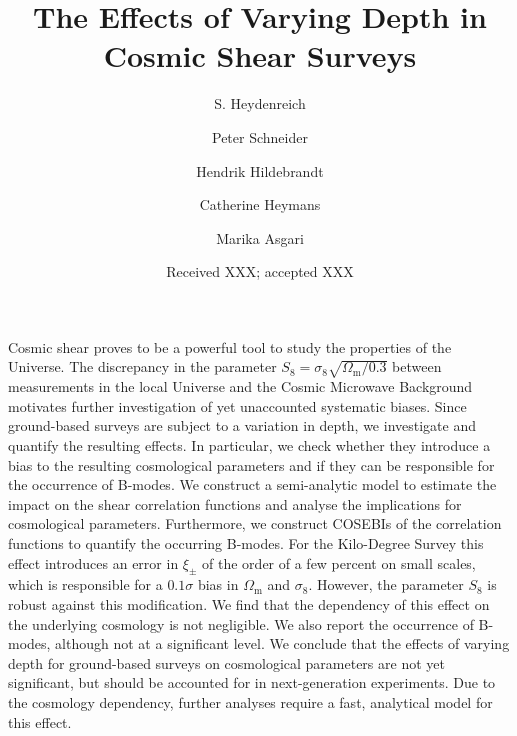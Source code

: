 \documentclass[referee]{aa} %
\renewcommand{\[}{\begin{equation}}
\renewcommand{\]}{\end{equation}}
\renewcommand{\rm}{\mathrm}
\begin{document}
 


   \title{The Effects of Varying Depth in Cosmic Shear Surveys}


   \author{S. Heydenreich%
          \and Peter Schneider 
          \and Hendrik Hildebrandt
          \and Catherine Heymans 
          \and Marika Asgari
          }

   \date{Received XXX; accepted XXX}

  \abstract
   {Cosmic shear proves to be a powerful tool to study the properties of the Universe. The discrepancy in the parameter $S_8 = \sigma_8\sqrt{\Omega_{\rm{m}}/0.3}$ between measurements in the local Universe and the Cosmic Microwave Background motivates further investigation of yet unaccounted systematic biases. 
   Since ground-based surveys are subject to a variation in depth, we investigate and quantify the resulting effects. In particular, we check whether they introduce a bias to the resulting cosmological parameters and if they can be responsible for the occurrence of B-modes.
   We construct a semi-analytic model to estimate the impact on the shear correlation functions and analyse the implications for cosmological parameters. Furthermore, we construct COSEBIs of the correlation functions to quantify the occurring B-modes.
   For the Kilo-Degree Survey this effect introduces an error in $\xi_\pm$ of the order of a few percent on small scales, which is responsible for a $0.1\sigma$ bias in $\Omega_{\rm m}$ and $\sigma_8$. However, the parameter $S_8$ is robust against this modification. We find that the dependency of this effect on the underlying cosmology is not negligible. We also report the occurrence of B-modes, although not at a significant level.
   We conclude that the effects of varying depth for ground-based surveys on cosmological parameters are not yet significant, but should be accounted for in next-generation experiments. Due to the cosmology dependency, further analyses require a fast, analytical model for this effect.}
\end{document}
